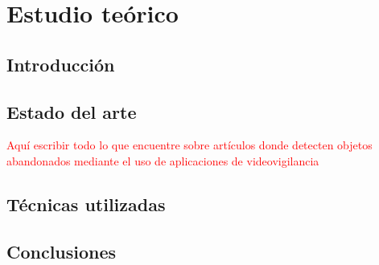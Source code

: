 
\chapter{Estudio teórico}
\label{cha:estudio-teorico}

\section{Introducción}
\label{sec:intro-sota}

\section{Estado del arte}
\label{sec:sota}

\textcolor{red}{Aquí escribir todo lo que encuentre sobre artículos donde detecten objetos abandonados mediante el uso de aplicaciones de videovigilancia}

\section{Técnicas utilizadas}
\label{sec:tecnicas-utilizadas}

\section{Conclusiones}
\label{sec:conclu-sota}
